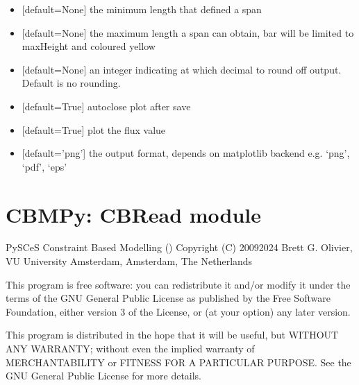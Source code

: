 \documentclass[letterpaper,10pt,english]{sphinxmanual}
\begin{document}
\begin{fulllineitems}
\begin{itemize}
\item {} 
\sphinxAtStartPar
{} {[}default=None{]} the minimum length that defined a span

\item {} 
\sphinxAtStartPar
{} {[}default=None{]} the maximum length a span can obtain, bar will be limited to maxHeight and coloured yellow

\item {} 
\sphinxAtStartPar
{} {[}default=None{]} an integer indicating at which decimal to round off output. Default is no rounding.

\item {} 
\sphinxAtStartPar
{} {[}default=True{]} autoclose plot after save

\item {} 
\sphinxAtStartPar
{} {[}default=True{]} plot the flux value

\item {} 
\sphinxAtStartPar
{} {[}default=’png’{]} the output format, depends on matplotlib backend e.g. ‘png’, ‘pdf’, ‘eps’

\end{itemize}

\end{fulllineitems}

\label{\detokenize{modules_doc:module-cbmpy.CBRead}}

\section{CBMPy: CBRead module}
\label{\detokenize{modules_doc:cbmpy-cbread-module}}
\sphinxAtStartPar
PySCeS Constraint Based Modelling ()
Copyright (C) 2009\sphinxhyphen{}2024 Brett G. Olivier, VU University Amsterdam, Amsterdam, The Netherlands

\sphinxAtStartPar
This program is free software: you can redistribute it and/or modify
it under the terms of the GNU General Public License as published by
the Free Software Foundation, either version 3 of the License, or
(at your option) any later version.

\sphinxAtStartPar
This program is distributed in the hope that it will be useful,
but WITHOUT ANY WARRANTY; without even the implied warranty of
MERCHANTABILITY or FITNESS FOR A PARTICULAR PURPOSE.  See the
GNU General Public License for more details.
\end{document}
